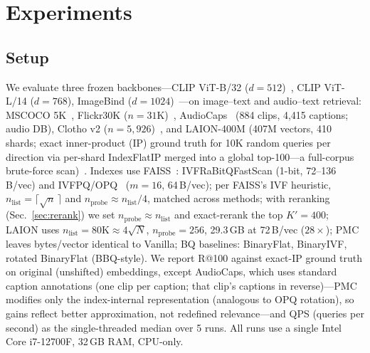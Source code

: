 \section{Experiments}\label{sec:experiments}

\subsection{Setup}\label{sec:exp-setup}

We evaluate three frozen backbones---CLIP ViT-B/32 ($d{=}512$)~\cite{radford2021clip}, CLIP ViT-L/14 ($d{=}768$), ImageBind ($d{=}1024$)~\cite{girdhar2023imagebind}---on image--text and audio--text retrieval: MSCOCO 5K~\cite{lin2014coco}, Flickr30K ($n{=}31$K)~\cite{young2014flickr30k}, AudioCaps~\cite{kim2019audiocaps} (884 clips, 4{,}415 captions; audio DB), Clotho v2 ($n{=}5{,}926$)~\cite{drossos2020clotho}, and LAION-400M (407M vectors, 410 shards; exact inner-product (IP) ground truth for 10K random queries per direction via per-shard IndexFlatIP merged into a global top-100---a full-corpus brute-force scan)~\cite{schuhmann2021laion}. Indexes use FAISS~\cite{johnson2021faiss,douze2024faiss}: IVFRaBitQFastScan (1-bit, 72--136\,B/vec) and IVFPQ/OPQ~\cite{jegou2011pq,ge2013opq} ($m{=}16$, 64\,B/vec); per FAISS's IVF heuristic, $n_\mathrm{list}{=}\lceil\sqrt{n}\,\rceil$ and $n_\mathrm{probe}{\approx}n_\mathrm{list}/4$, matched across methods; with reranking (Sec.~\ref{sec:rerank}) we set $n_\mathrm{probe}{\approx}n_\mathrm{list}$ and exact-rerank the top $K'{=}400$; LAION uses $n_\mathrm{list}{=}80\mathrm{K}{\approx}4\sqrt{N}$, $n_\mathrm{probe}{=}256$, 29.3\,GB at 72\,B/vec ($28\times$); PMC leaves bytes/vector identical to Vanilla; BQ baselines: BinaryFlat, BinaryIVF, rotated BinaryFlat (BBQ-style). We report R@100 against exact-IP ground truth on original (unshifted) embeddings, except AudioCaps, which uses standard caption annotations (one clip per caption; that clip's captions in reverse)---PMC modifies only the index-internal representation (analogous to OPQ rotation), so gains reflect better approximation, not redefined relevance---and QPS (queries per second) as the single-threaded median over 5 runs. All runs use a single Intel Core i7-12700F, 32\,GB RAM, CPU-only.

